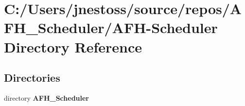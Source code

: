 \section{C\+:/\+Users/jnestoss/source/repos/\+A\+F\+H\+\_\+\+Scheduler/\+A\+F\+H-\/\+Scheduler Directory Reference}
\label{dir_abbbf7612fb46491bf55aff87a166e65}
\subsection*{Directories}
\begin{DoxyCompactItemize}
\item 
directory \textbf{ A\+F\+H\+\_\+\+Scheduler}
\end{DoxyCompactItemize}
